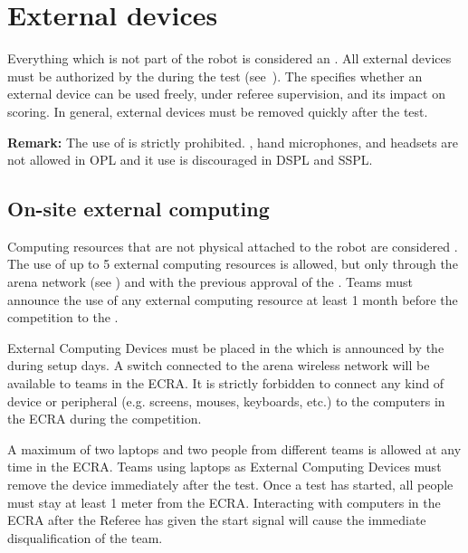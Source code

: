 % 
% 

\section{External devices}
\label{rule:robot_external_devices}
Everything which is not part of the robot is considered an .
All external devices must be authorized by the  during the  test (see~).
The  specifies whether an external device can be used freely, under referee supervision, and its impact on scoring.
In general, external devices must be removed quickly after the test.
	
\noindent \textbf{Remark:} The use of  is strictly prohibited. , hand microphones, and headsets are not allowed in OPL and it use is discouraged in DSPL and SSPL.

\subsection{On-site external computing}
Computing resources that are not physical attached to the robot are considered .
The use of up to 5 external computing resources is allowed, but only through the arena network (see ) and with the previous approval of the .
Teams must announce the use of any external computing resource at least 1 month before the competition to the .

External Computing Devices must be placed in the  which is announced by the  during setup days.
A switch connected to the arena wireless network will be available to teams in the ECRA.
It is strictly forbidden to connect any kind of device or peripheral (e.g. screens, mouses, keyboards, etc.) to the computers in the ECRA during the competition.

A maximum of two laptops and two people from different teams is allowed at any time in the ECRA.
Teams using laptops as External Computing Devices must remove the device immediately after the test.
Once a test has started, all people must stay at least 1 meter from the ECRA.
Interacting with computers in the ECRA after the Referee has given the start signal will cause the immediate disqualification of the team.

